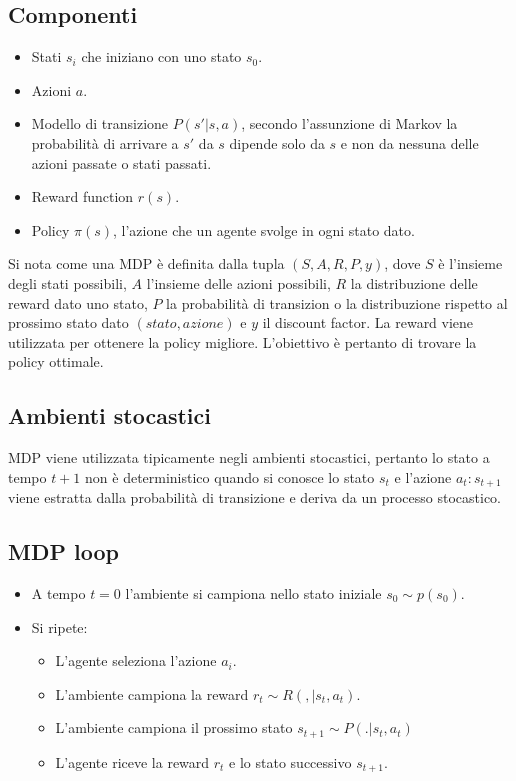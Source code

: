 	\subsection{Componenti}
	\begin{itemize}
		\item Stati $s_i$ che iniziano con uno stato $s_0$.
		\item Azioni $a$.
		\item Modello di transizione $P(s'|s,a)$, secondo l'assunzione di Markov la probabilit\`a di arrivare a $s'$ da $s$ dipende solo da $s$ e non da nessuna delle azioni passate o stati passati.
		\item Reward function $r(s)$.
		\item Policy $\pi(s)$, l'azione che un agente svolge in ogni stato dato.
	\end{itemize}
	Si nota come una MDP \`e definita dalla tupla $(S, A, R, P, y)$, dove $S$ \`e l'insieme degli stati possibili, $A$ l'insieme delle azioni possibili, $R$ la distribuzione delle reward dato uno stato, $P$ la probabilit\`a di transizion o la distribuzione rispetto al prossimo stato dato $(stato, azione)$ e $y$ il discount factor.
	La reward viene utilizzata per ottenere la policy migliore.
	L'obiettivo \`e pertanto di trovare la policy ottimale.

	\subsection{Ambienti stocastici}
	MDP viene utilizzata tipicamente negli ambienti stocastici, pertanto lo stato a tempo $t+1$ non \`e deterministico quando si conosce lo stato $s_t$ e l'azione $a_t:s_{t+1}$ viene estratta dalla probabilit\`a di transizione e deriva da un processo stocastico.

	\subsection{MDP loop}
	\begin{itemize}
		\item A tempo $t=0$ l'ambiente si campiona nello stato iniziale $s_0\sim p(s_0)$.
		\item Si ripete:
			\begin{itemize}
				\item L'agente seleziona l'azione $a_i$.
				\item L'ambiente campiona la reward $r_t\sim R(,|s_t, a_t)$.
				\item L'ambiente campiona il prossimo stato $s_{t+1}\sim P(.|s_t, a_t)$
				\item L'agente riceve la reward $r_t$ e lo stato successivo $s_{t+1}$.
			\end{itemize}
	\end{itemize}

